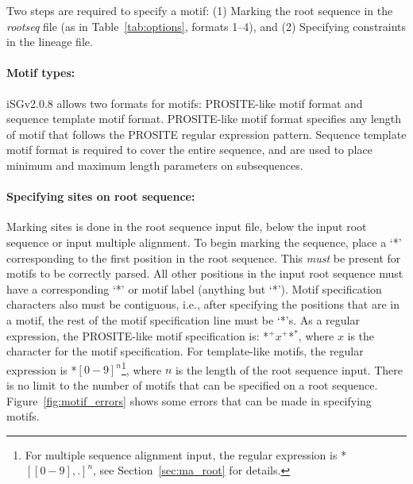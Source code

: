 \documentclass[10pt]{article}
\newcommand{\version}{2.0.8 }
\newcommand{\iSGcurrentshort}{iSGv\version }
\begin{document}
 Two steps are required to specify a motif: (1) Marking the root sequence in the \textit{rootseq} file (as in Table~\ref{tab:options}, formats 1--4), and (2) Specifying constraints in the lineage file.

  \paragraph{Motif types:} \iSGcurrentshort allows two formats for motifs: PROSITE-like motif format and sequence template motif format. PROSITE-like motif format specifies any length of motif that follows the PROSITE regular expression pattern. Sequence template motif format is required to cover the entire sequence, and are used to place minimum and maximum length parameters on subsequences.

  \paragraph{Specifying sites on root sequence:} Marking sites is done in the root sequence input file, below the input root sequence or input multiple alignment. To begin marking the sequence, place a `*' corresponding to the first position in the root sequence. This \emph{must} be present for motifs to be correctly parsed. All other positions in the input root sequence must have a corresponding `*' or motif label (anything but `*'). Motif specification characters also must be contiguous, i.e., after specifying the positions that are in a motif, the rest of the motif specification line must be `*'s. As a regular expression, the PROSITE-like motif specification is: *$^+x^+$*$^*$, where $x$ is the character for the motif specification. For template-like motifs, the regular expression is *$[0-9]^n$\footnote{For multiple sequence alignment input, the regular expression is *$[[0-9],.]^n$, see Section~\ref{sec:ma_root} for details.}, where $n$ is the length of the root sequence input. There is no limit to the number of motifs that can be specified on a root sequence. Figure~\ref{fig:motif_errors} shows some errors that can be made in specifying motifs.
\end{document}
